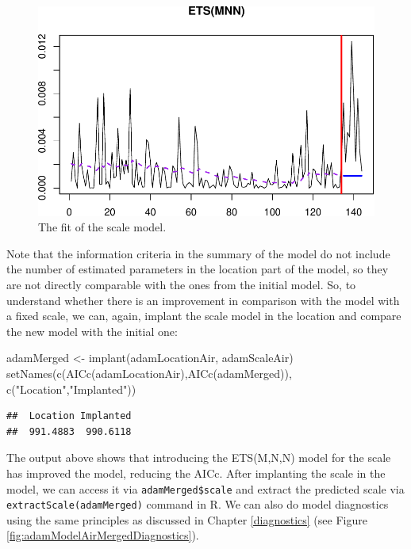 \documentclass[
]{book}
\newenvironment{Shaded}{\begin{snugshade}}{\end{snugshade}}
\newcommand{\FunctionTok}[1]{\textcolor[rgb]{0.00,0.00,0.00}{#1}}
\newcommand{\NormalTok}[1]{#1}
\newcommand{\OtherTok}[1]{\textcolor[rgb]{0.56,0.35,0.01}{#1}}
\newcommand{\StringTok}[1]{\textcolor[rgb]{0.31,0.60,0.02}{#1}}
\theoremstyle{definition}
\theoremstyle{definition}
\theoremstyle{definition}
\theoremstyle{definition}
\theoremstyle{remark}
\begin{document}
\begin{figure}
\centering
\includegraphics{Svetunkov--2022----ADAM_files/figure-latex/adamModelAirScaleLinear-1.pdf}
\caption{\label{fig:adamModelAirScaleLinear}The fit of the scale model.}
\end{figure}

Note that the information criteria in the summary of the model do not include the number of estimated parameters in the location part of the model, so they are not directly comparable with the ones from the initial model. So, to understand whether there is an improvement in comparison with the model with a fixed scale, we can, again, implant the scale model in the location and compare the new model with the initial one:

\begin{Shaded}
\begin{Highlighting}[]
\NormalTok{adamMerged }\OtherTok{\textless{}{-}} \FunctionTok{implant}\NormalTok{(adamLocationAir, adamScaleAir)}
\FunctionTok{setNames}\NormalTok{(}\FunctionTok{c}\NormalTok{(}\FunctionTok{AICc}\NormalTok{(adamLocationAir),}\FunctionTok{AICc}\NormalTok{(adamMerged)),}
         \FunctionTok{c}\NormalTok{(}\StringTok{"Location"}\NormalTok{,}\StringTok{"Implanted"}\NormalTok{))}
\end{Highlighting}
\end{Shaded}

\begin{verbatim}
##  Location Implanted 
##  991.4883  990.6118
\end{verbatim}

The output above shows that introducing the ETS(M,N,N) model for the scale has improved the model, reducing the AICc. After implanting the scale in the model, we can access it via \texttt{adamMerged\$scale} and extract the predicted scale via \texttt{extractScale(adamMerged)} command in R. We can also do model diagnostics using the same principles as discussed in Chapter \ref{diagnostics} (see Figure \ref{fig:adamModelAirMergedDiagnostics}).
\end{document}
